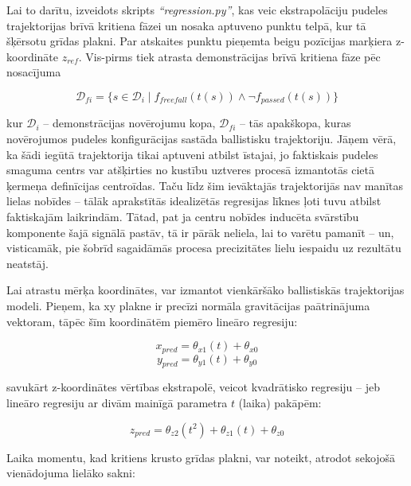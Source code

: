 \documentclass[12pt, a4paper]{article}
\numberwithin{equation}{section} %
\begin{document}
Lai to darītu, izveidots skripts \textit{``regression.py''}, kas veic ekstrapolāciju pudeles trajektorijas brīvā kritiena fāzei un nosaka aptuveno punktu telpā, kur tā šķērsotu grīdas plakni. Par atskaites punktu pieņemta beigu pozīcijas marķiera z-koordināte $z_{ref}$. Vis-pirms tiek atrasta demonstrācijas brīvā kritiena fāze pēc nosacījuma


\begin{equation}
    \mathcal{D}_{fi} = \lbrace s \in \mathcal{D}_i \mid f_{freefall}(t(s)) \land \lnot f_{passed}(t(s)) \rbrace
\end{equation}

kur $\mathcal{D}_i$ -- demonstrācijas novērojumu kopa, $\mathcal{D}_{fi}$ -- tās apakškopa, kuras novērojumos pudeles konfigurācijas sastāda ballistisku trajektoriju. Jāņem vērā, ka šādi iegūtā trajektorija tikai aptuveni atbilst īstajai, jo faktiskais pudeles smaguma centrs var atšķirties no kustību uztveres procesā izmantotās cietā ķermeņa definīcijas centroīdas. Taču līdz šim ievāktajās trajektorijās nav manītas lielas nobīdes -- tālāk aprakstītās idealizētās regresijas līknes ļoti tuvu atbilst faktiskajām laikrindām. Tātad, pat ja centru nobīdes inducēta svārstību komponente šajā signālā pastāv, tā ir pārāk neliela, lai to varētu pamanīt -- un, visticamāk, pie šobrīd sagaidāmās procesa precizitātes lielu iespaidu uz rezultātu neatstāj.

Lai atrastu mērķa koordinātes, var izmantot vienkāršāko ballistiskās trajektorijas modeli. Pieņem, ka xy plakne ir precīzi normāla gravitācijas paātrinājuma vektoram, tāpēc šīm koordinātēm piemēro lineāro regresiju:


\begin{equation}
    x_{pred} = \theta_{x1}(t) + \theta_{x0}
\end{equation}
\begin{equation}
    y_{pred} = \theta_{y1}(t) + \theta_{y0}
\end{equation}

savukārt z-koordinātes vērtības ekstrapolē, veicot kvadrātisko regresiju -- jeb lineāro regresiju ar divām mainīgā parametra $t$ (laika) pakāpēm:

\begin{equation}
    z_{pred} = \theta_{z2}(t^2) + \theta_{z1}(t) + \theta_{z0}
\end{equation}

Laika momentu, kad kritiens krusto grīdas plakni, var noteikt,  atrodot sekojošā vienādojuma lielāko sakni:
\end{document}
